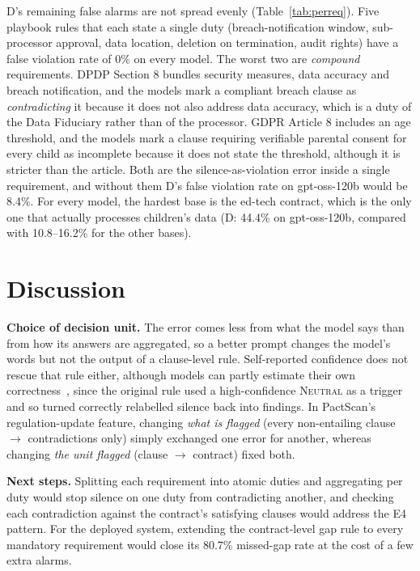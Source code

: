 \documentclass[conference]{IEEEtran}
\begin{document}
D's remaining false alarms are not spread evenly (Table~\ref{tab:perreq}). Five playbook rules that each state a single duty (breach-notification window, sub-processor approval, data location, deletion on termination, audit rights) have a false violation rate of 0\% on every model. The worst two are \emph{compound} requirements. DPDP Section 8 bundles security measures, data accuracy and breach notification, and the models mark a compliant breach clause as \emph{contradicting} it because it does not also address data accuracy, which is a duty of the Data Fiduciary rather than of the processor. GDPR Article 8 includes an age threshold, and the models mark a clause requiring verifiable parental consent for every child as incomplete because it does not state the threshold, although it is stricter than the article. Both are the silence-as-violation error inside a single requirement, and without them D's false violation rate on gpt-oss-120b would be 8.4\%. For every model, the hardest base is the ed-tech contract, which is the only one that actually processes children's data (D: 44.4\% on gpt-oss-120b, compared with 10.8--16.2\% for the other bases).

\section{Discussion}

\textbf{Choice of decision unit.} The error comes less from what the model says than from how its answers are aggregated, so a better prompt changes the model's words but not the output of a clause-level rule. Self-reported confidence does not rescue that rule either, although models can partly estimate their own correctness~\cite{kadavath2022know}, since the original rule used a high-confidence \textsc{Neutral} as a trigger and so turned correctly relabelled silence back into findings. In PactScan's regulation-update feature, changing \emph{what is flagged} (every non-entailing clause $\to$ contradictions only) simply exchanged one error for another, whereas changing \emph{the unit flagged} (clause $\to$ contract) fixed both.

\textbf{Next steps.} Splitting each requirement into atomic duties and aggregating per duty would stop silence on one duty from contradicting another, and checking each contradiction against the contract's satisfying clauses would address the E4 pattern. For the deployed system, extending the contract-level gap rule to every mandatory requirement would close its 80.7\% missed-gap rate at the cost of a few extra alarms.
\end{document}
